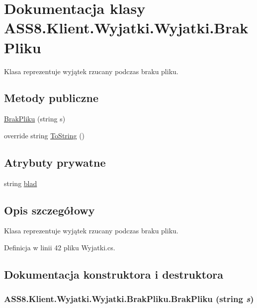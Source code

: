 \hypertarget{a00036}{
\section{Dokumentacja klasy ASS8.Klient.Wyjatki.Wyjatki.BrakPliku}
\label{de/d8c/a00036}
}
Klasa reprezentuje wyjątek rzucany podczas braku pliku.  


\subsection*{Metody publiczne}
\begin{CompactItemize}
\item 
\hyperlink{a00036_e40f7777f8cbe2eb4a5bdabdceee028e}{BrakPliku} (string s)
\item 
override string \hyperlink{a00036_f5b9bbc55ddd946c98f2cd3c4ae9b494}{ToString} ()
\end{CompactItemize}
\subsection*{Atrybuty prywatne}
\begin{CompactItemize}
\item 
string \hyperlink{a00036_3c7c0c6922b7a786e1a7e61109ac7f80}{blad}
\end{CompactItemize}


\subsection{Opis szczegółowy}
Klasa reprezentuje wyjątek rzucany podczas braku pliku. 



Definicja w linii 42 pliku Wyjatki.cs.

\subsection{Dokumentacja konstruktora i destruktora}
\hypertarget{a00036_e40f7777f8cbe2eb4a5bdabdceee028e}{
\subsubsection[{BrakPliku}]{\setlength{\rightskip}{0pt plus 5cm}ASS8.Klient.Wyjatki.Wyjatki.BrakPliku.BrakPliku (string {\em s})}}
\label{de/d8c/a00036_e40f7777f8cbe2eb4a5bdabdceee028e}




